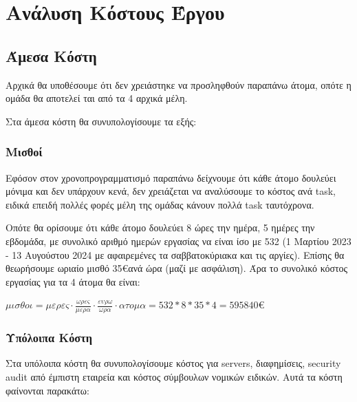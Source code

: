 \documentclass[12pt,a4paper]{article}
\begin{document}
\section{Ανάλυση Κόστους Έργου}

\subsection{Άμεσα Κόστη}

Αρχικά θα υποθέσουμε ότι δεν χρειάστηκε να προσληφθούν παραπάνω άτομα, οπότε η ομάδα θα αποτελεί ται από τα 4 αρχικά μέλη.

Στα άμεσα κόστη θα συνυπολογίσουμε τα εξής:

\subsubsection{Μισθοί}
Εφόσον στον χρονοπρογραμματισμό παραπάνω δείχνουμε ότι κάθε άτομο δουλεύει μόνιμα και δεν υπάρχουν κενά, δεν χρειάζεται να αναλύσουμε το κόστος ανά task, ειδικά επειδή πολλές φορές μέλη της ομάδας κάνουν πολλά task ταυτόχρονα.

Οπότε θα ορίσουμε ότι κάθε άτομο δουλεύει 8 ώρες την ημέρα, 5 ημέρες την εβδομάδα, με συνολικό αριθμό ημερών εργασίας να είναι ίσο με 532 (1 Μαρτίου 2023 - 13 Αυγούστου 2024 με αφαιρεμένες τα σαββατοκύριακα και τις αργίες). Επίσης θα θεωρήσουμε ωριαίο μισθό 35\euro\space ανά ώρα (μαζί με ασφάλιση). Άρα το συνολικό κόστος εργασίας για τα 4 άτομα θα είναι:

$μισθοι = μερες \cdot \frac{ωρες}{μερα} \cdot \frac{ευρω}{ωρα} \cdot ατομα = 532 * 8 * 35 * 4 = 595840\euro$

\subsubsection{Υπόλοιπα Κόστη}

Στα υπόλοιπα κόστη θα συνυπολογίσουμε κόστος για servers, διαφημίσεις, security audit από έμπιστη εταιρεία και κόστος σύμβουλων νομικών ειδικών. Αυτά τα κόστη φαίνονται παρακάτω:
\end{document}
